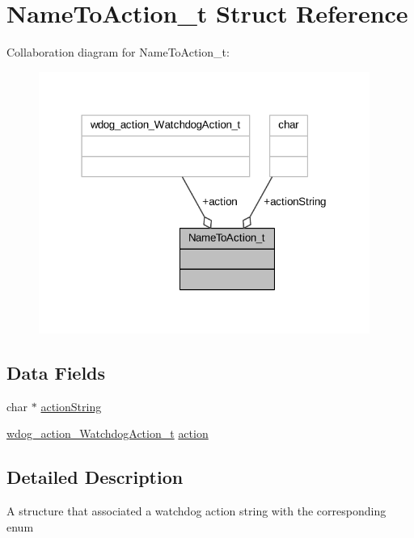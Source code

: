 \hypertarget{struct_name_to_action__t}{}\section{Name\+To\+Action\+\_\+t Struct Reference}
\label{struct_name_to_action__t}


Collaboration diagram for Name\+To\+Action\+\_\+t\+:
\nopagebreak
\begin{figure}[H]
\begin{center}
\leavevmode
\includegraphics[width=307pt]{struct_name_to_action__t__coll__graph}
\end{center}
\end{figure}
\subsection*{Data Fields}
\begin{DoxyCompactItemize}
\item 
char $\ast$ \hyperlink{struct_name_to_action__t_a77c03f3c2b942477e543ddaa54c55328}{action\+String}
\item 
\hyperlink{daemons_2linux_2supervisor_2watchdog_action_8h_a564b482466482512da0352e768e90852}{wdog\+\_\+action\+\_\+\+Watchdog\+Action\+\_\+t} \hyperlink{struct_name_to_action__t_a9b80b568766add277afdc4a365d2fa23}{action}
\end{DoxyCompactItemize}


\subsection{Detailed Description}
A structure that associated a watchdog action string with the corresponding enum 

